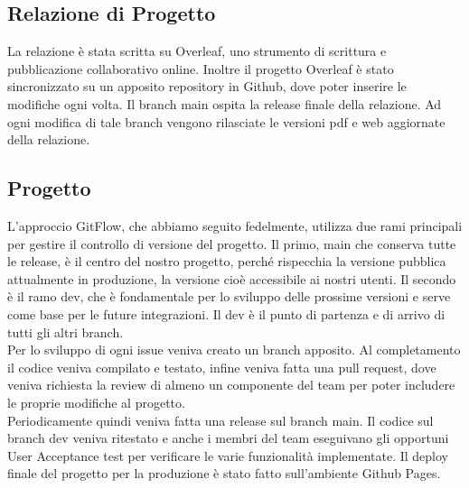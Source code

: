     \subsection{Relazione di Progetto}
        La relazione è stata scritta su Overleaf, uno strumento di scrittura e pubblicazione collaborativo online.
        Inoltre il progetto Overleaf è stato sincronizzato su un apposito repository in Github, dove poter inserire le modifiche ogni volta. Il branch main ospita la release finale della relazione. Ad ogni modifica di tale branch vengono rilasciate le versioni pdf e web aggiornate della relazione. 
        
    \subsection{Progetto}
   
         L’approccio GitFlow, che abbiamo seguito fedelmente, utilizza due rami principali per gestire il controllo di versione del progetto. Il primo, main che conserva tutte le release, è il centro del nostro progetto, perché rispecchia la versione pubblica attualmente in produzione, la versione cioè accessibile ai nostri utenti. Il secondo è il ramo dev, che è fondamentale per lo sviluppo delle prossime versioni e serve come base per le future integrazioni. Il dev è il punto di partenza e di arrivo di tutti gli altri branch.\\
    Per lo sviluppo di ogni issue veniva creato un branch apposito. Al completamento il codice veniva compilato e testato, infine veniva fatta una pull request, dove veniva richiesta la review di almeno un componente del team per poter includere le proprie modifiche al progetto.\\
    Periodicamente quindi veniva fatta una release sul branch main. Il codice sul branch dev veniva ritestato e anche i membri del team eseguivano gli opportuni User Acceptance test per verificare le varie funzionalità implementate. 
    Il deploy finale del progetto per la produzione è stato fatto sull'ambiente Github Pages.
   
        
        





